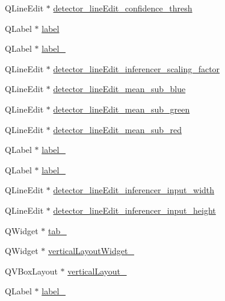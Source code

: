 \begin{DoxyCompactItemize}
\item 
Q\+Line\+Edit $\ast$ \hyperlink{class_ui___main_window_aa9d4c728b3fcf744eb112623a4f78fb4}{detector\+\_\+line\+Edit\+\_\+confidence\+\_\+thresh}
\item 
Q\+Label $\ast$ \hyperlink{class_ui___main_window_ad9c89133780f28e6efa2ec17ceb9cff5}{label}
\item 
Q\+Label $\ast$ \hyperlink{class_ui___main_window_a28c2887d26bf987c2472ba13b552dd69}{label\+\_}
\item 
Q\+Line\+Edit $\ast$ \hyperlink{class_ui___main_window_ab75582e9c6d56d5c88350cd92a6a9714}{detector\+\_\+line\+Edit\+\_\+inferencer\+\_\+scaling\+\_\+factor}
\item 
Q\+Line\+Edit $\ast$ \hyperlink{class_ui___main_window_aafb8f7c4b3e052d4e1d2976b55de37ce}{detector\+\_\+line\+Edit\+\_\+mean\+\_\+sub\+\_\+blue}
\item 
Q\+Line\+Edit $\ast$ \hyperlink{class_ui___main_window_a49e4989a34486c8bab58be2af4b7e128}{detector\+\_\+line\+Edit\+\_\+mean\+\_\+sub\+\_\+green}
\item 
Q\+Line\+Edit $\ast$ \hyperlink{class_ui___main_window_abb17b35ba15b00f8bac0e5f03cbafe60}{detector\+\_\+line\+Edit\+\_\+mean\+\_\+sub\+\_\+red}
\item 
Q\+Label $\ast$ \hyperlink{class_ui___main_window_a92ada1ca7f65b72ecf4cba1198c44380}{label\+\_}
\item 
Q\+Label $\ast$ \hyperlink{class_ui___main_window_a4640e3039f2d34e4deb39787925c7d37}{label\+\_}
\item 
Q\+Line\+Edit $\ast$ \hyperlink{class_ui___main_window_a5ad61ba7d082a872113f7cb13bc67fa0}{detector\+\_\+line\+Edit\+\_\+inferencer\+\_\+input\+\_\+width}
\item 
Q\+Line\+Edit $\ast$ \hyperlink{class_ui___main_window_aeb9e475c74534e581b7879ffd8ab9a35}{detector\+\_\+line\+Edit\+\_\+inferencer\+\_\+input\+\_\+height}
\item 
Q\+Widget $\ast$ \hyperlink{class_ui___main_window_a41c7e77dd12b9445e13dbe8fb5ae1488}{tab\+\_}
\item 
Q\+Widget $\ast$ \hyperlink{class_ui___main_window_aa7f97762b7467881d2fadd20f19956f2}{vertical\+Layout\+Widget\+\_}
\item 
Q\+V\+Box\+Layout $\ast$ \hyperlink{class_ui___main_window_afb6bb8ab195766b2b18cee42bcdc246b}{vertical\+Layout\+\_}
\item 
Q\+Label $\ast$ \hyperlink{class_ui___main_window_ac1cbc41e9dbaeb3d0bdc2189d8e9ee1d}{label\+\_}
\item 

\end{DoxyCompactItemize}
